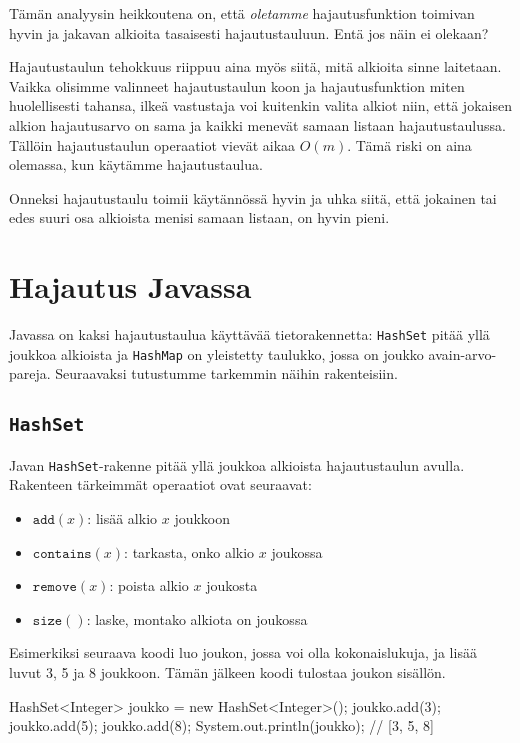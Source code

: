 Tämän analyysin heikkoutena on, että \emph{oletamme}
hajautusfunktion toimivan hyvin ja jakavan alkioita
tasaisesti hajautustauluun. Entä jos näin ei olekaan?

Hajautustaulun tehokkuus riippuu aina myös siitä,
mitä alkioita sinne laitetaan.
Vaikka olisimme valinneet hajautustaulun koon ja
hajautusfunktion miten huolellisesti tahansa,
ilkeä vastustaja voi kuitenkin valita alkiot
niin, että jokaisen alkion hajautusarvo on sama ja
kaikki menevät samaan listaan hajautustaulussa.
Tällöin hajautustaulun operaatiot vievät aikaa $O(m)$.
Tämä riski on aina olemassa, kun käytämme hajautustaulua.

Onneksi hajautustaulu toimii käytännössä hyvin ja 
uhka siitä, että jokainen tai edes suuri osa alkioista
menisi samaan listaan, on hyvin pieni.

\section{Hajautus Javassa}

Javassa on kaksi hajautustaulua käyttävää tietorakennetta:
\texttt{HashSet} pitää yllä joukkoa alkioista
ja \texttt{HashMap} on yleistetty taulukko,
jossa on joukko avain-arvo-pareja.
Seuraavaksi tutustumme tarkemmin näihin rakenteisiin.

\subsection{\texttt{HashSet}}

Javan \texttt{HashSet}-rakenne pitää yllä joukkoa alkioista
hajautustaulun avulla.
Rakenteen tärkeimmät operaatiot ovat seuraavat:

\begin{itemize}
\item $\texttt{add}(x)$: lisää alkio $x$ joukkoon
\item $\texttt{contains}(x)$: tarkasta, onko alkio $x$ joukossa
\item $\texttt{remove}(x)$: poista alkio $x$ joukosta
\item $\texttt{size}()$: laske, montako alkiota on joukossa
\end{itemize}

Esimerkiksi seuraava koodi luo joukon, jossa voi olla
kokonaislukuja, ja lisää luvut 3, 5 ja 8 joukkoon.
Tämän jälkeen koodi tulostaa joukon sisällön.

\begin{code}
HashSet<Integer> joukko = new HashSet<Integer>();
joukko.add(3);
joukko.add(5);
joukko.add(8);
System.out.println(joukko); // [3, 5, 8]
\end{code}

